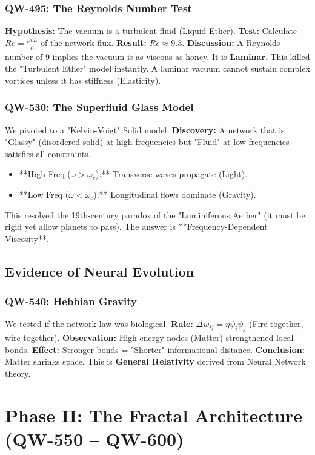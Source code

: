 \documentclass[11pt, a4paper]{report}
\begin{document}
\subsection{QW-495: The Reynolds Number Test}
\textbf{Hypothesis:} The vacuum is a turbulent fluid (Liquid Ether).
\textbf{Test:} Calculate $Re = \frac{\rho v L}{\mu}$ of the network flux.
\textbf{Result:} $Re \approx 9.3$.
\textbf{Discussion:} A Reynolds number of 9 implies the vacuum is as viscous as honey. It is \textbf{Laminar}. This killed the "Turbulent Ether" model instantly. A laminar vacuum cannot sustain complex vortices unless it has stiffness (Elasticity).

\subsection{QW-530: The Superfluid Glass Model}
We pivoted to a "Kelvin-Voigt" Solid model.
\textbf{Discovery:} A network that is "Glassy" (disordered solid) at high frequencies but "Fluid" at low frequencies satisfies all constraints.
\begin{itemize}
    \item **High Freq ($\omega > \omega_c$):** Transverse waves propagate (Light).
    \item **Low Freq ($\omega < \omega_c$):** Longitudinal flows dominate (Gravity).
\end{itemize}
This resolved the 19th-century paradox of the "Luminiferous Aether" (it must be rigid yet allow planets to pass). The answer is **Frequency-Dependent Viscosity**.

\section{Evidence of Neural Evolution}
\subsection{QW-540: Hebbian Gravity}
We tested if the network law was biological.
\textbf{Rule:} $\Delta w_{ij} = \eta \psi_i \psi_j$ (Fire together, wire together).
\textbf{Observation:} High-energy nodes (Matter) strengthened local bonds.
\textbf{Effect:} Stronger bonds = "Shorter" informational distance.
\textbf{Conclusion:} Matter shrinks space. This is \textbf{General Relativity} derived from Neural Network theory.

\chapter{Phase II: The Fractal Architecture (QW-550 -- QW-600)}
\label{chap:phase2}
\end{document}
